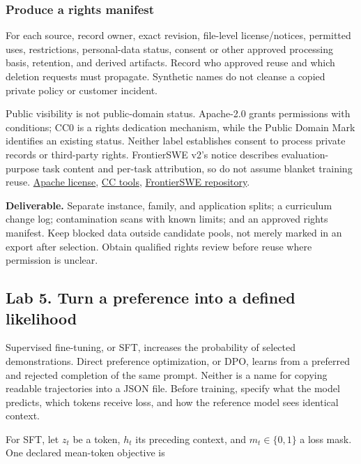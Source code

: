 \documentclass[
  11pt,
  letterpaper,
]{article}
\begin{document}
\subsubsection{Produce a rights
manifest}\label{produce-a-rights-manifest}

For each source, record owner, exact revision, file-level
license/notices, permitted uses, restrictions, personal-data status,
consent or other approved processing basis, retention, and derived
artifacts. Record who approved reuse and which deletion requests must
propagate. Synthetic names do not cleanse a copied private policy or
customer incident.

Public visibility is not public-domain status. Apache-2.0 grants
permissions with conditions; CC0 is a rights dedication mechanism, while
the Public Domain Mark identifies an existing status. Neither label
establishes consent to process private records or third-party rights.
FrontierSWE v2's notice describes evaluation-purpose task content and
per-task attribution, so do not assume blanket training reuse.
\href{https://www.apache.org/licenses/LICENSE-2.0}{Apache license},
\href{https://creativecommons.org/public-domain/}{CC tools},
\href{https://github.com/Proximal-Labs/frontier-swe-v2}{FrontierSWE
repository}.

\textbf{Deliverable.} Separate instance, family, and application splits;
a curriculum change log; contamination scans with known limits; and an
approved rights manifest. Keep blocked data outside candidate pools, not
merely marked in an export after selection. Obtain qualified rights
review before reuse where permission is unclear.

\subsection{Lab 5. Turn a preference into a defined
likelihood}\label{lab-5.-turn-a-preference-into-a-defined-likelihood}

Supervised fine-tuning, or SFT, increases the probability of selected
demonstrations. Direct preference optimization, or DPO, learns from a
preferred and rejected completion of the same prompt. Neither is a name
for copying readable trajectories into a JSON file. Before training,
specify what the model predicts, which tokens receive loss, and how the
reference model sees identical context.

For SFT, let \(z_t\) be a token, \(h_t\) its preceding context, and
\(m_t\in\{0,1\}\) a loss mask. One declared mean-token objective is
\end{document}
